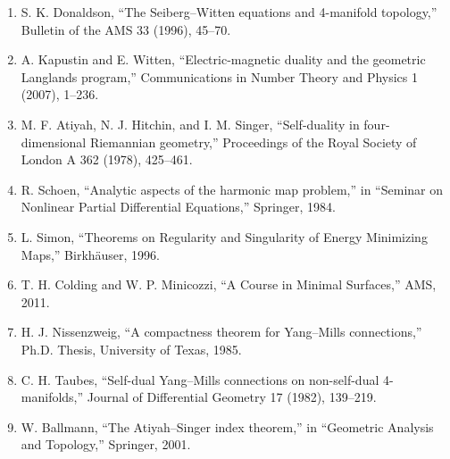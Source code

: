 \begin{enumerate}
\item S. K. Donaldson, ``The Seiberg--Witten equations and 4-manifold topology,'' Bulletin of the AMS 33 (1996), 45--70.
\item A. Kapustin and E. Witten, ``Electric-magnetic duality and the geometric Langlands program,'' Communications in Number Theory and Physics 1 (2007), 1--236.
\item M. F. Atiyah, N. J. Hitchin, and I. M. Singer, ``Self-duality in four-dimensional Riemannian geometry,'' Proceedings of the Royal Society of London A 362 (1978), 425--461.
\item R. Schoen, ``Analytic aspects of the harmonic map problem,'' in ``Seminar on Nonlinear Partial Differential Equations,'' Springer, 1984.
\item L. Simon, ``Theorems on Regularity and Singularity of Energy Minimizing Maps,'' Birkh\"auser, 1996.
\item T. H. Colding and W. P. Minicozzi, ``A Course in Minimal Surfaces,'' AMS, 2011.
\item H. J. Nissenzweig, ``A compactness theorem for Yang--Mills connections,'' Ph.D. Thesis, University of Texas, 1985.
\item C. H. Taubes, ``Self-dual Yang--Mills connections on non-self-dual 4-manifolds,'' Journal of Differential Geometry 17 (1982), 139--219.
\item W. Ballmann, ``The Atiyah--Singer index theorem,'' in ``Geometric Analysis and Topology,'' Springer, 2001.
\end{enumerate}
